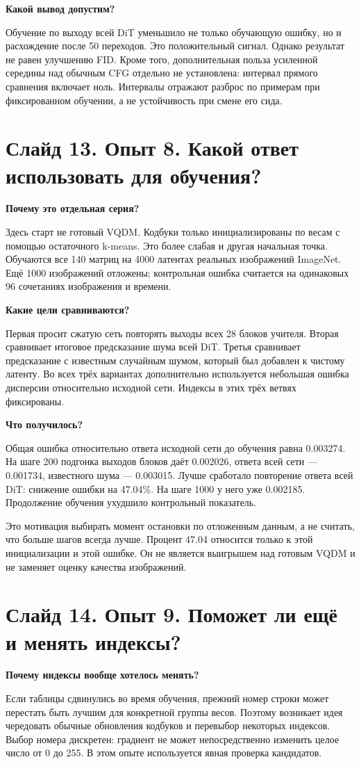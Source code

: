 \documentclass[a4paper,11pt]{article}
\newcommand{\slide}[2]{\clearpage\section*{Слайд #1. #2}}
\newcommand{\question}[1]{\par\textbf{#1}\par}
\begin{document}
\question{Какой вывод допустим?}
Обучение по выходу всей DiT уменьшило не только обучающую ошибку,
но и расхождение после 50 переходов. Это положительный сигнал.
Однако результат не равен улучшению FID. Кроме того, дополнительная
польза усиленной середины над обычным CFG отдельно не установлена:
интервал прямого сравнения включает ноль. Интервалы отражают разброс
по примерам при фиксированном обучении, а не устойчивость при смене его сида.

\slide{13}{Опыт 8. Какой ответ использовать для обучения?}
\question{Почему это отдельная серия?}
Здесь старт не готовый VQDM. Кодбуки только инициализированы по весам
с помощью остаточного k-means. Это более слабая и другая начальная точка.
Обучаются все 140 матриц на 4000 латентах реальных изображений ImageNet.
Ещё 1000 изображений отложены; контрольная ошибка считается на одинаковых
96 сочетаниях изображения и времени.

\question{Какие цели сравниваются?}
Первая просит сжатую сеть повторять выходы всех 28 блоков учителя.
Вторая сравнивает итоговое предсказание шума всей DiT.
Третья сравнивает предсказание с известным случайным шумом, который
был добавлен к чистому латенту. Во всех трёх вариантах дополнительно
используется небольшая ошибка дисперсии относительно исходной сети.
Индексы в этих трёх ветвях фиксированы.

\question{Что получилось?}
Общая ошибка относительно ответа исходной сети до обучения равна 0.003274.
На шаге 200 подгонка выходов блоков даёт 0.002026, ответа всей сети ---
0.001734, известного шума --- 0.003015. Лучше сработало повторение ответа
всей DiT: снижение ошибки на 47.04\%. На шаге 1000 у него уже 0.002185.
Продолжение обучения ухудшило контрольный показатель.

Это мотивация выбирать момент остановки по отложенным данным, а не считать,
что больше шагов всегда лучше. Процент 47.04 относится только к этой
инициализации и этой ошибке. Он не является выигрышем над готовым VQDM
и не заменяет оценку качества изображений.

\slide{14}{Опыт 9. Поможет ли ещё и менять индексы?}
\question{Почему индексы вообще хотелось менять?}
Если таблицы сдвинулись во время обучения, прежний номер строки может
перестать быть лучшим для конкретной группы весов. Поэтому возникает
идея чередовать обычные обновления кодбуков и перевыбор некоторых индексов.
Выбор номера дискретен: градиент не может непосредственно изменить целое
число от 0 до 255. В этом опыте используется явная проверка кандидатов.
\end{document}
